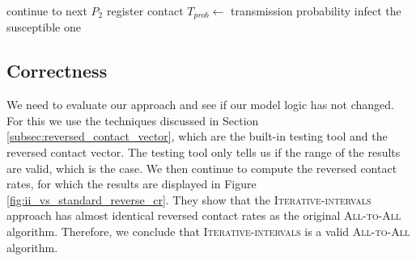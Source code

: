 \begin{algorithm}
\begin{algorithmic}[1]
                                \State continue to next $P_{2}$
                            \EndIf
                                \State register contact
                                    \State $T_{prob} \gets$ transmission probability
                                        \State infect the susceptible one
                                    \EndIf
                                \EndIf
                            \EndIf
                        \EndForeach
                    \EndForeach
                \EndIf
            \EndFor
        \EndFor
    \EndIf
\end{algorithmic}
\end{algorithm}

\subsection{Correctness}
\label{subsec:correctness_iterative_intervals}
We need to evaluate our approach and see if our model logic has not changed. For this we use the techniques discussed in Section \ref{subsec:reversed_contact_vector}, which are the built-in testing tool and the reversed contact vector. The testing tool only tells us if the range of the results are valid, which is the case. We then continue to compute the reversed contact rates, for which the results are displayed in Figure \ref{fig:ii_vs_standard_reverse_cr}. They show that the \textsc{Iterative-intervals} approach has almost identical reversed contact rates as the original \textsc{All-to-All} algorithm. Therefore, we conclude that \textsc{Iterative-intervals} is a valid \textsc{All-to-All} algorithm.

